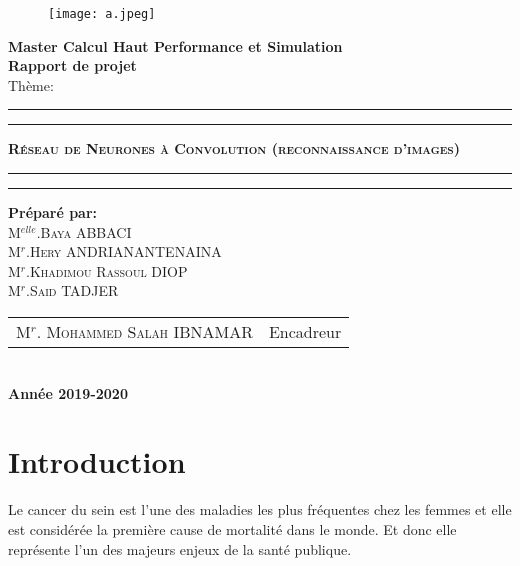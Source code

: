 \documentclass[a4paper,11pt]{report}
\theoremstyle{definition}
\begin{document}
\begin{center}
\begin{figure}[!htbp]
\begin{center}
\texttt{[image: a.jpeg]}
\end{center}
\end{figure}


{\Large {\bf { Master Calcul Haut Performance et Simulation }}}\\
 \textbf{\Huge { Rapport de projet}} \\
{\huge {Thème:}}\\
\hrule
\hrule
{}
{\huge \textbf{\textsc{ Réseau de Neurones à Convolution (reconnaissance d’images) }}}\\
\hrule
\hrule
{}
{\textbf{\Large{Préparé par:}}}\\
{\large\textsc{M$^{elle}$.Baya ABBACI}}\\
{\large\textsc{M$^{r}$.Hery ANDRIANANTENAINA}}\\
{\large\textsc{M$^{r}$.Khadimou Rassoul DIOP}}\\
{\large\textsc{M$^{r}$.Said TADJER }}\\
{\large
\begin{tabular}{ll}
M$^{r}$. \textsc{Mohammed Salah} IBNAMAR  & Encadreur    \\
\end{tabular}
}\\
{\Large\textbf{ Année 2019-2020}}
\end{center}


\tableofcontents


\chapter*{Introduction}

Le cancer du sein est l'une des maladies les plus fréquentes chez les femmes et elle est considérée la première cause de mortalité dans le monde. Et donc elle représente l'un des majeurs enjeux de la santé publique.\\
\end{document}
